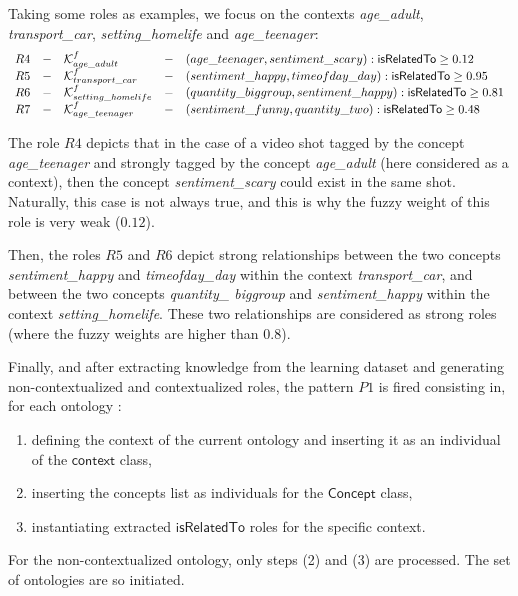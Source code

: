 		Taking some roles as examples, we focus on the contexts \emph{age\_adult}, \emph{transport\_car},
		\emph{setting\_homelife} and \emph{age\_teenager}:
		\begin{equation*}
			\begin{array}{ c c l c l}
			R4 & - &\mathcal{K}^{f}_{age\_adult} 
				& - & (age\_teenager,sentiment\_scary):\mathsf{isRelatedTo} \geq 0.12\\
			R5 & - &\mathcal{K}^{f}_{transport\_car}
				& - & (sentiment\_happy,timeofday\_day):\mathsf{isRelatedTo} \geq 0.95\\
			R6 & - &\mathcal{K}^{f}_{setting\_homelife} 
				& - & (quantity\_biggroup,sentiment\_happy):\mathsf{isRelatedTo} \geq 0.81\\
			R7 & - &\mathcal{K}^{f}_{age\_teenager}
				& - & (sentiment\_funny,quantity\_two):\mathsf{isRelatedTo} \geq 0.48
			
			\end{array}
		\end{equation*}

		The role $R4$ depicts that in the case of a video shot tagged by the concept \emph{age\_teenager} 
		and strongly tagged by the concept \emph{age\_adult} (here considered as a context), then the concept 
		\emph{sentiment\_scary} could exist in the same shot. Naturally, this case is not always true, 
		and this is why the fuzzy weight of this role is very weak ($0.12$).

		Then, the roles $R5$  and $R6$ depict strong relationships between the two concepts 
		\emph{sentiment\_happy} and \emph{timeofday\_day} within the context \emph{transport\_car},
		and between the two concepts \emph{quantity\_ biggroup} and \emph{sentiment\_happy} within 
		the context \emph{setting\_homelife}. These two relationships are considered as strong roles 
		(where the fuzzy weights are higher than $0.8$).

		Finally, and after extracting knowledge from the learning dataset and generating non-contextualized
		and contextualized roles, the pattern $P1$ is fired consisting in, for each ontology :
		\begin{enumerate}
			\item defining the context of the current ontology and inserting
			 it as an individual of the $\mathsf{context}$ class,
			\item inserting the concepts list as individuals for the $\mathsf{Concept}$ class,
			\item instantiating extracted $\mathsf{isRelatedTo}$ roles for the specific context.
		\end{enumerate}
		For the non-contextualized ontology, 
		only steps (2) and (3) are processed. The set of ontologies are so initiated.
		
